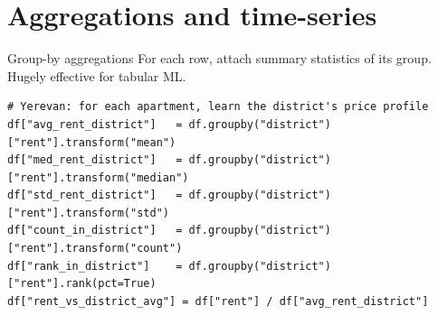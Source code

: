 \documentclass[aspectratio=169]{beamer}
\begin{document}
\section{Aggregations and time-series}

\begin{frame}[fragile]{Group-by aggregations}
  For each row, attach summary statistics of its group. Hugely effective for tabular ML.
  \vfill
{\lstset{basicstyle=\ttfamily\scriptsize}
\begin{lstlisting}
# Yerevan: for each apartment, learn the district's price profile
df["avg_rent_district"]   = df.groupby("district")["rent"].transform("mean")
df["med_rent_district"]   = df.groupby("district")["rent"].transform("median")
df["std_rent_district"]   = df.groupby("district")["rent"].transform("std")
df["count_in_district"]   = df.groupby("district")["rent"].transform("count")
df["rank_in_district"]    = df.groupby("district")["rent"].rank(pct=True)
df["rent_vs_district_avg"] = df["rent"] / df["avg_rent_district"]
\end{lstlisting}}
  \vfill
\end{frame}
\end{document}
